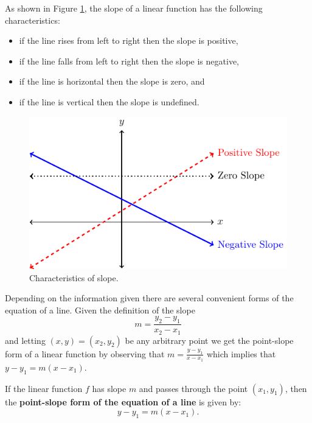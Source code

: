 As shown in Figure \ref{f:0.1slope}, the slope of a linear function has the following characteristics:
\begin{itemize}
    \item if the line rises from left to right then the slope is positive,
    \item if the line falls from left to right then the slope is negative,
    \item if the line is horizontal then the slope is zero, and
    \item if the line is vertical then the slope is undefined.
\end{itemize}
\begin{figure}
    \begin{center}
        \includegraphics[width=0.6\columnwidth]{figures/0-1-fig3.pdf}
    \end{center}
    \caption{Characteristics of slope.}
    \label{f:0.1slope}
\end{figure}

Depending on the information given there are several convenient forms of the equation of a
line.  Given the definition of the slope
\[ m = \frac{y_2 - y_1}{x_2 - x_1} \]
and letting $(x,y) = (x_2,y_2)$ be any arbitrary point we get the point-slope form of a
linear function by observing that $m = \frac{y - y_1}{x - x_1}$ which implies
that $y - y_1 = m(x-x_1)$.
\begin{definition}
If the linear function $f$ has slope $m$ and passes through the
point $(x_1,y_1)$, then the {\bf point-slope form of the equation of a line} is given by: 
\[ y-y_1=m(x- x_1).  \]
\end{definition}

